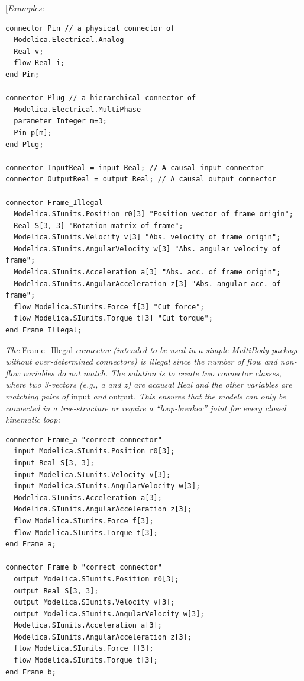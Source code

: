 \documentclass[10pt,a4paper]{report}
\begin{document}
{[}\emph{Examples:}

\begin{lstlisting}[language=modelica]
connector Pin // a physical connector of
  Modelica.Electrical.Analog
  Real v;
  flow Real i;
end Pin;

connector Plug // a hierarchical connector of
  Modelica.Electrical.MultiPhase
  parameter Integer m=3;
  Pin p[m];
end Plug;

connector InputReal = input Real; // A causal input connector
connector OutputReal = output Real; // A causal output connector

connector Frame_Illegal
  Modelica.SIunits.Position r0[3] "Position vector of frame origin";
  Real S[3, 3] "Rotation matrix of frame";
  Modelica.SIunits.Velocity v[3] "Abs. velocity of frame origin";
  Modelica.SIunits.AngularVelocity w[3] "Abs. angular velocity of frame";
  Modelica.SIunits.Acceleration a[3] "Abs. acc. of frame origin";
  Modelica.SIunits.AngularAcceleration z[3] "Abs. angular acc. of frame";
  flow Modelica.SIunits.Force f[3] "Cut force";
  flow Modelica.SIunits.Torque t[3] "Cut torque";
end Frame_Illegal;
\end{lstlisting}

\emph{The} Frame\_Illegal \emph{connector (intended to be used in a
simple MultiBody-package without over-determined connectors) is illegal
since the number of flow and non-flow variables do not match. The
solution is to create two connector classes, where two 3-vectors (e.g.,
a and z) are acausal Real and the other variables are matching pairs of}
input \emph{and} output\emph{. This ensures that the models can only be
connected in a tree-structure or require a ``loop-breaker'' joint for
every closed kinematic loop:}

\begin{lstlisting}[language=modelica]
connector Frame_a "correct connector"
  input Modelica.SIunits.Position r0[3];
  input Real S[3, 3];
  input Modelica.SIunits.Velocity v[3];
  input Modelica.SIunits.AngularVelocity w[3];
  Modelica.SIunits.Acceleration a[3];
  Modelica.SIunits.AngularAcceleration z[3];
  flow Modelica.SIunits.Force f[3];
  flow Modelica.SIunits.Torque t[3];
end Frame_a;

connector Frame_b "correct connector"
  output Modelica.SIunits.Position r0[3];
  output Real S[3, 3];
  output Modelica.SIunits.Velocity v[3];
  output Modelica.SIunits.AngularVelocity w[3];
  Modelica.SIunits.Acceleration a[3];
  Modelica.SIunits.AngularAcceleration z[3];
  flow Modelica.SIunits.Force f[3];
  flow Modelica.SIunits.Torque t[3];
end Frame_b;
\end{lstlisting}
\end{document}
